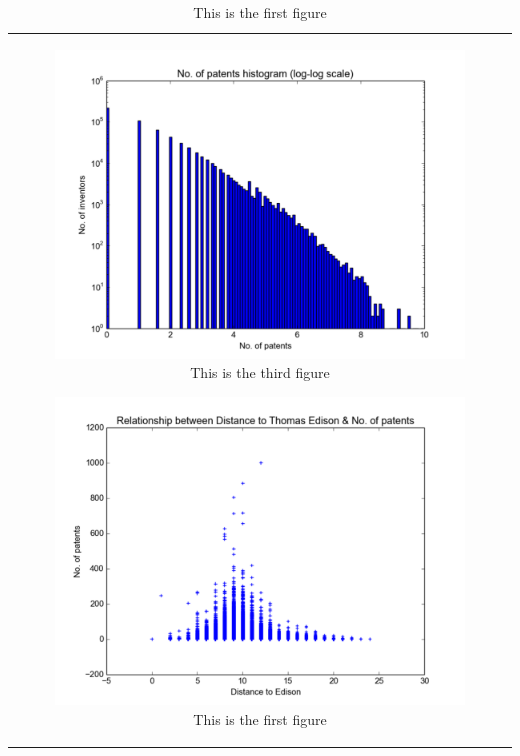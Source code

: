 \begin{table}[t] 
  \begin{tabular}{@{}c@{}} 
   \begin{minipage}{0.45\linewidth}
      \begin{figure}[H]
          \includegraphics[scale=0.425]{../figures/patent.pdf}
          \caption{This is the third figure}
      \end{figure}
  \end{minipage}
  \begin{minipage}{0.45\linewidth}
      \begin{figure}[H]
          \includegraphics[scale=0.425]{../figures/distance_patent.pdf}
          \caption{This is the first figure}
      \end{figure}
  \end{minipage}
  \end{tabular}
\end{table}
